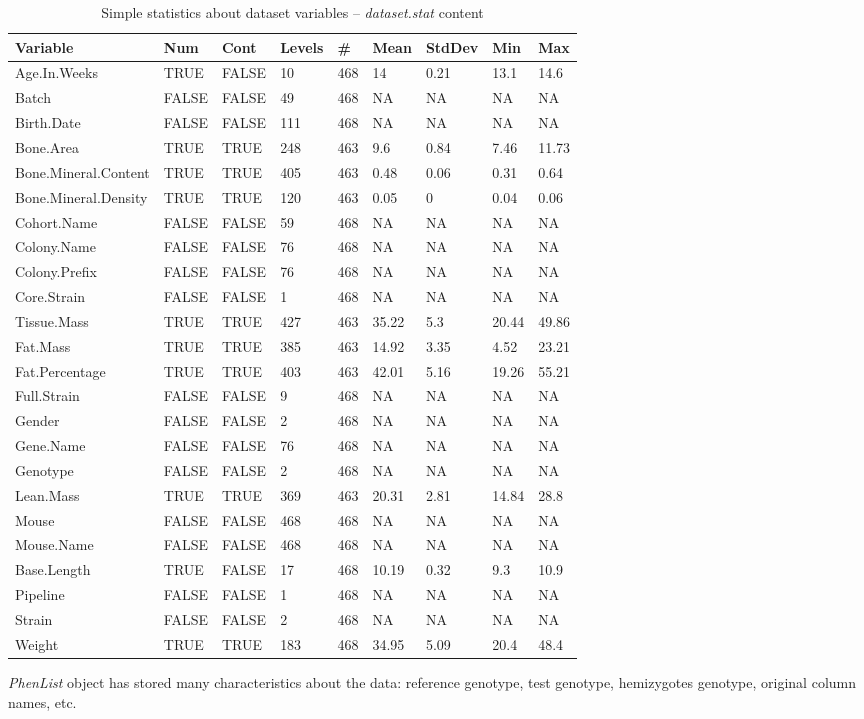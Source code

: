 \documentclass[12pt,a4paper]{article}
\begin{document}
\begin{table}[!h]
\begin{center}
\begin{tabular}{|l|l| l | l | l | l | l | l | l |}
  \hline
Variable&Num&Cont&Levels&\#&Mean&StdDev&Min&Max\\\hline
Age.In.Weeks&TRUE&FALSE&10&468&14&0.21&13.1&14.6\\
Batch&FALSE&FALSE&49&468&NA&NA&NA&NA\\
Birth.Date&FALSE&FALSE&111&468&NA&NA&NA&NA\\
Bone.Area&TRUE&TRUE&248&463&9.6&0.84&7.46&11.73\\
Bone.Mineral.Content&TRUE&TRUE&405&463&0.48&0.06&0.31&0.64\\
Bone.Mineral.Density&TRUE&TRUE&120&463&0.05&0&0.04&0.06\\
Cohort.Name&FALSE&FALSE&59&468&NA&NA&NA&NA\\
Colony.Name&FALSE&FALSE&76&468&NA&NA&NA&NA\\
Colony.Prefix&FALSE&FALSE&76&468&NA&NA&NA&NA\\
Core.Strain&FALSE&FALSE&1&468&NA&NA&NA&NA\\
Tissue.Mass&TRUE&TRUE&427&463&35.22&5.3&20.44&49.86\\
Fat.Mass&TRUE&TRUE&385&463&14.92&3.35&4.52&23.21\\
Fat.Percentage&TRUE&TRUE&403&463&42.01&5.16&19.26&55.21\\
Full.Strain&FALSE&FALSE&9&468&NA&NA&NA&NA\\
Gender&FALSE&FALSE&2&468&NA&NA&NA&NA\\
Gene.Name&FALSE&FALSE&76&468&NA&NA&NA&NA\\
Genotype&FALSE&FALSE&2&468&NA&NA&NA&NA\\
Lean.Mass&TRUE&TRUE&369&463&20.31&2.81&14.84&28.8\\
Mouse&FALSE&FALSE&468&468&NA&NA&NA&NA\\
Mouse.Name&FALSE&FALSE&468&468&NA&NA&NA&NA\\
Base.Length&TRUE&FALSE&17&468&10.19&0.32&9.3&10.9\\
Pipeline&FALSE&FALSE&1&468&NA&NA&NA&NA\\
Strain&FALSE&FALSE&2&468&NA&NA&NA&NA\\
Weight&TRUE&TRUE&183&468&34.95&5.09&20.4&48.4\\
\hline  
\end{tabular}
\caption{Simple statistics about dataset variables -- \textit{dataset.stat} content}\label{table:05}
\end{center}
\end{table}
\textit{PhenList} object has stored many characteristics about the data: reference genotype, test genotype, hemizygotes genotype, original column names, etc.
\end{document}
